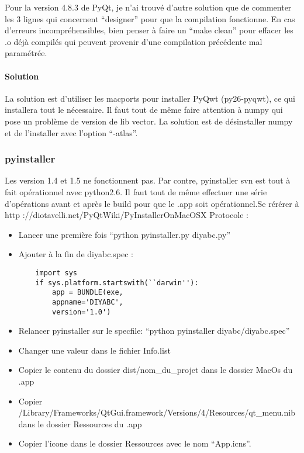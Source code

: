 \documentclass[12pt,a4paper]{article}
\begin{document}
        Pour la version 4.8.3 de PyQt, je n'ai trouvé d'autre solution que de commenter les 3 lignes qui concernent
        ``designer'' pour que la compilation fonctionne. En cas d'erreurs incompréhensibles, bien penser à faire un ``make clean''
        pour effacer les .o déjà compilés qui peuvent provenir d'une compilation précédente mal paramétrée.

        \paragraph{Solution}

        La solution est d'utiliser les macports pour installer PyQwt (py26-pyqwt), ce qui installera tout le n\'ecessaire. Il faut tout de même
        faire attention à numpy qui pose un problème de version de lib vector. La solution est de d\'esinstaller numpy et de l'installer avec l'option
        ``-atlas''. 
        
        \subsubsection{pyinstaller}

        Les version 1.4 et 1.5 ne fonctionnent pas. Par contre,
        pyinstaller svn est tout à fait op\'erationnel avec python2.6. Il faut tout de même effectuer une s\'erie d'op\'erations avant et après
        le build pour que le .app soit op\'erationnel.Se r\'er\'erer à \newline
        http ://diotavelli.net/PyQtWiki/PyInstallerOnMacOSX \newline
        Protocole : 
        \label{mac_pyinstaller}
        \begin{itemize}
            \item Lancer une première fois ``python pyinstaller.py diyabc.py''
            \item Ajouter à la fin de diyabc.spec :
        \begin{verbatim}
    import sys 
    if sys.platform.startswith(``darwin''): 
        app = BUNDLE(exe, 
        appname='DIYABC', 
        version='1.0')
        \end{verbatim}
            \item Relancer pyinstaller sur le specfile: ``python pyinstaller diyabc/diyabc.spec''
            \item Changer une valeur dans le fichier Info.list
            \item Copier le contenu du dossier dist/nom\_du\_projet dans le dossier MacOs du .app
            \item Copier /Library/Frameworks/QtGui.framework/Versions/4/Resources/qt\_menu.nib dans le dossier Ressources du .app
            \item Copier l'icone dans le dossier Ressources avec le nom ``App.icns''.\\
        \end{itemize}
\end{document}
